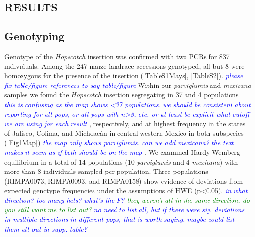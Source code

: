 \documentclass[11pt]{article}
\newcommand{\jri}[1]{\textcolor{blue}{ \emph{\scriptsize  #1}} }
\newcommand{\lev}[1]{\textcolor{green}{\emph{\scriptsize #1}} }
\begin{document}
\begin{linenumbers}
\begin{flushleft}
\begin{centering}
\section*{RESULTS}
\end{centering}

\subsection*{Genotyping}

Genotype of the \emph{Hopscotch} insertion was confirmed with two PCRs for 837 individuals. Among the 247 maize landrace accessions genotyped, all but 8 were homozygous for the presence of the insertion (\ref{TableS1Mays}, \ref{TableS2}). \jri{please fix table/figure references to say table/figure} Within our \emph{parviglumis} and \emph{mexicana} samples we found the \emph{Hopscotch} insertion segregating in 37 and 4 populations \jri{this is confusing as the map shows <37 populations. we should be consistent about reporting for all pops, or all pops with n>8, etc. or at least be explicit what cutoff we are using for each result}, respectively, and at highest frequency in the states of Jalisco, Colima, and Michoac\'{a}n in central-western Mexico in both subspecies (\ref{Fig1Map}) \jri{the map only shows parviglumis. can we add mexicana? the text makes it seem as if both should be on the map}. We examined Hardy-Weinberg equilibrium in a total of 14 populations (10 \emph{parviglumis} and 4 \emph{mexicana}) with more than 8 individuals sampled per population. Three populations (RIMPA0073, RIMPA0093, and RIMPA0158) show evidence of deviations from expected genotype frequencies under the assumptions of HWE (p<0.05).  \jri{in what direction? too many hets? what's the F? } \lev{they weren't all in the same direction, do you still want me to list out?} \jri{no need to list all, but if there were sig. deviations in multiple directions in different pops, that is worth saying. maybe could list them all out in supp. table?}


\end{flushleft}
\end{linenumbers}
\end{document}
